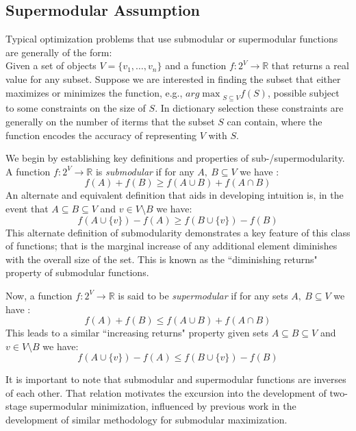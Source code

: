\documentclass{article}
\newcommand{\R}{\mathbb{R}}
\begin{document}
\subsection{Supermodular Assumption}\label{sec:supermod}

\noindent Typical optimization problems that use submodular or supermodular functions are generally of the form:\\

\noindent Given a set of objects $V=\{v_1,\ldots,v_n\}$ and a function $f:2^V\to \R$ that returns a real value for any subset. Suppose we are interested in finding the subset that either maximizes or minimizes the function, e.g., ${arg\max}_{S\subseteq V} f(S)$, possible subject to some constraints on the size of $S$. In dictionary selection these constraints are generally on the number of iterms that the subset $S$ can contain, where the function encodes the accuracy of representing $V$ with $S$.

\noindent We begin by establishing key definitions and properties of sub-/supermodularity.\\

\noindent A function $f:2^V\to \R$ is \textit{submodular} if for any $A,\ B \subseteq V$ we have : $$f(A) + f(B) \geq f(A\cup B) + f(A\cap B)$$ An alternate and equivalent definition that aids in developing intuition is, in the event that $A\subseteq B \subseteq V$ and $v\in V\setminus B$ we have: $$f(A\cup \{v\}) - f(A) \geq f(B\cup\{v\}) - f(B)$$
This alternate definition of submodularity demonstrates a key feature of this class of functions; that is the marginal increase of any additional element diminishes with the overall size of the set. This is known as the ``diminishing returns" property of submodular functions.

\noindent Now, a function $f:2^V\to \R$ is said to be \textit{supermodular} if for any sets $A,\ B \subseteq V$ we have : $$f(A) + f(B) \leq f(A\cup B) + f(A\cap B)$$ This leads to a similar ``increasing returns" property given sets $A\subseteq B \subseteq V$ and $v\in V\setminus B$ we have: $$f(A\cup \{v\}) - f(A) \leq f(B\cup\{v\}) - f(B)$$

\noindent It is important to note that submodular and supermodular functions are inverses of each other. That relation motivates the excursion into the development of two-stage supermodular minimization, influenced by previous work in the development of similar methodology for submodular maximization.
\end{document}
